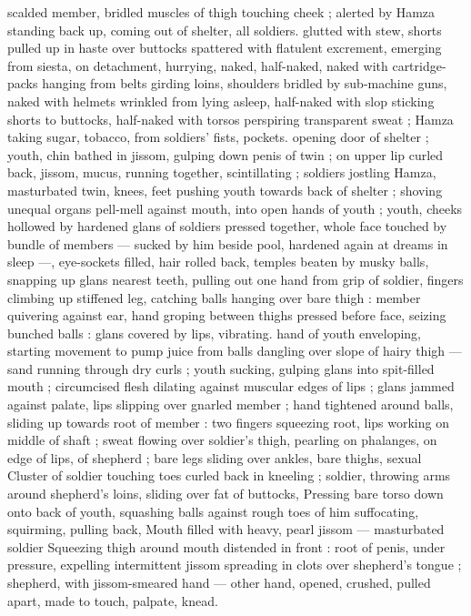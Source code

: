 scalded member, bridled muscles of thigh touching cheek ; alerted
by Hamza standing back up, coming out of shelter, all soldiers.
glutted with stew, shorts pulled up in haste over buttocks spattered
with flatulent excrement, emerging from siesta, on detachment,
hurrying, naked, half-naked, naked with cartridge-packs hanging
from belts girding loins, shoulders bridled by sub-machine guns,
naked with helmets wrinkled from lying asleep, half-naked with slop
sticking shorts to buttocks, half-naked with torsos perspiring
transparent sweat ; Hamza taking sugar, tobacco, from soldiers’ fists,
pockets. opening door of shelter ; youth, chin bathed in jissom,
gulping down penis of twin ; on upper lip curled back, jissom, mucus,
running together, scintillating ; soldiers jostling Hamza, masturbated
twin, knees, feet pushing youth towards back of shelter ; shoving
unequal organs pell-mell against mouth, into open hands of youth ;
youth, cheeks hollowed by hardened glans of soldiers pressed
together, whole face touched by bundle of members --- sucked by
him beside pool, hardened again at dreams in sleep ---, eye-sockets
filled, hair rolled back, temples beaten by musky balls, snapping up
glans nearest teeth, pulling out one hand from grip of soldier, fingers
climbing up stiffened leg, catching balls hanging over bare thigh :
member quivering against ear, hand groping between thighs pressed
before face, seizing bunched balls : glans covered by lips, vibrating.
hand of youth enveloping, starting movement to pump juice from
balls dangling over slope of hairy thigh --- sand running through dry
curls ; youth sucking, gulping glans into spit-filled mouth ;
circumcised flesh dilating against muscular edges of lips ; glans
jammed against palate, lips slipping over gnarled member ; hand
tightened around balls, sliding up towards root of member : two
fingers squeezing root, lips working on middle of shaft ; sweat
flowing over soldier's thigh, pearling on phalanges, on edge of lips,
of shepherd ; bare legs sliding over ankles, bare thighs, sexual
Cluster of soldier touching toes curled back in kneeling ; soldier,
throwing arms around shepherd's loins, sliding over fat of buttocks,
Pressing bare torso down onto back of youth, squashing balls
against rough toes of him suffocating, squirming, pulling back,
Mouth filled with heavy, pearl jissom --- masturbated soldier
Squeezing thigh around mouth distended in front : root of penis,
under pressure, expelling intermittent jissom spreading in clots over
shepherd's tongue ; shepherd, with jissom-smeared hand --- other
hand, opened, crushed, pulled apart, made to touch, palpate, knead.
